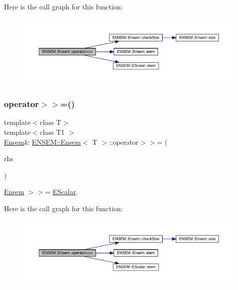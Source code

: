 Here is the call graph for this function\+:
\nopagebreak
\begin{figure}[H]
\begin{center}
\leavevmode
\includegraphics[width=350pt]{d7/d3e/classENSEM_1_1Ensem_a9511b1d1b45de39920d451700eecd4d9_cgraph}
\end{center}
\end{figure}
\mbox{\label{classENSEM_1_1Ensem_a9511b1d1b45de39920d451700eecd4d9}} 
\subsubsection{\texorpdfstring{operator$>$$>$=()}{operator>>=()}\hspace{0.1cm}{\footnotesize\ttfamily [3/3]}}
{\footnotesize\ttfamily template$<$class T$>$ \\
template$<$class T1 $>$ \\
\mbox{\hyperlink{classENSEM_1_1Ensem}{Ensem}}\& \mbox{\hyperlink{classENSEM_1_1Ensem}{E\+N\+S\+E\+M\+::\+Ensem}}$<$ T $>$\+::operator$>$$>$= (\begin{DoxyParamCaption}\item[{const \mbox{\hyperlink{classENSEM_1_1EScalar}{E\+Scalar}}$<$ T1 $>$ \&}]{rhs }\end{DoxyParamCaption})\hspace{0.3cm}{\ttfamily [inline]}}



\mbox{\hyperlink{classENSEM_1_1Ensem}{Ensem}} $>$$>$= \mbox{\hyperlink{classENSEM_1_1EScalar}{E\+Scalar}}. 

Here is the call graph for this function\+:
\nopagebreak
\begin{figure}[H]
\begin{center}
\leavevmode
\includegraphics[width=350pt]{d7/d3e/classENSEM_1_1Ensem_a9511b1d1b45de39920d451700eecd4d9_cgraph}
\end{center}
\end{figure}
\mbox{\label{classENSEM_1_1Ensem_a7f9a469a80ccb509892aef8d356fd81e}} 
